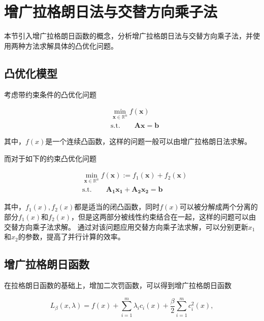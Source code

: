 \section{增广拉格朗日法与交替方向乘子法}

本节引入增广拉格朗日函数的概念，分析增广拉格朗日法\cite{1976AugLagrange}与交替方向乘子法\cite{2017ADMM}，并使用两种方法求解具体的凸优化问题。

\subsection{凸优化模型}

考虑带约束条件的凸优化问题

\begin{equation}\label{eq_admm_1}
    \begin{split}
        &\min\limits_{\bm{x}\in \mathbb{R}^{n}} f(\bm{x}) \\
        &\mathrm{s. t.} \quad\quad \bm{Ax} = \bm{b}
    \end{split}
\end{equation}

其中，$f(x)$是一个连续凸函数，这样的问题一般可以由增广拉格朗日法求解。

而对于如下的约束凸优化问题

\begin{equation}\label{eq_admm_2}
    \begin{split}
        &\min\limits_{\bm{x}\in \mathbb{R}^{n}} f(\bm{x}) := f_{1}(\bm{x}) + f_{2}(\bm{x}) \\
        &\mathrm{s. t.} \quad\quad \bm{A_{1}x_{1}} + \bm{A_{2}x_{2}} = \bm{b} 
    \end{split}
\end{equation}

其中，$f_{1}(x), f_{2}(x)$都是适当的闭凸函数，同时$f(x)$可以被分解成两个分离的部分$f_{1}(x)$和$f_{2}(x)$，但是这两部分被线性约束结合在一起，这样的问题可以由交替方向乘子法求解。
通过对该问题应用交替方向乘子法求解，可以分别更新$x_{1}$和$x_{2}$的参数，提高了并行计算的效率。

\subsection{增广拉格朗日函数}

在拉格朗日函数的基础上，增加二次罚函数，可以得到增广拉格朗日函数

\begin{equation}\label{eq_admm_3}
    L_{\beta}(x, \lambda) = f(x) + \sum_{i=1}^{m}\lambda_{i} c_{i}(x) + \frac{\beta}{2}\sum_{i=1}^{m}c_{i}^{2}(x),
\end{equation}

